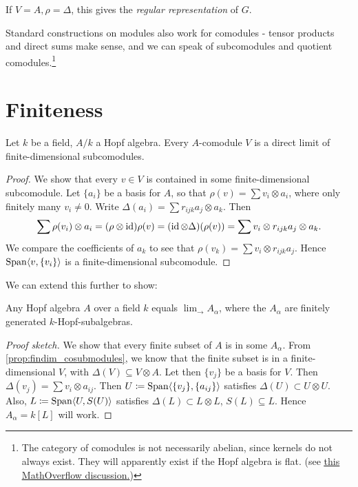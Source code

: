 \documentclass{memoir}
\begin{document}
\begin{example}
	If $ V=A, \rho=\Delta $, this gives the \emph{regular representation} of $ G $.
\end{example}

Standard constructions on modules also work for comodules - tensor products and direct sums make sense, and we can speak of subcomodules and quotient comodules.\footnote{The category of comodules is not necessarily abelian, since kernels do not always exist. They will apparently exist if the Hopf algebra is flat. (see \href{https://mathoverflow.net/questions/94115/when-a-comodule-category-is-equivalent-to-a-module-category}{\underline{this MathOverflow discussion}.})}

\section{Finiteness}\label{sec:finiteness}
\begin{proposition}\label{prop:findim_cosubmodules}
	Let $ k $ be a field, $ A/k $ a Hopf algebra. Every $ A $-comodule $ V $ is a direct limit of finite-dimensional subcomodules.
\end{proposition}
\begin{proof}
	We show that every $ v\in V $ is contained in some finite-dimensional subcomodule. Let $ \{a_i\} $ be a basis for $ A $, so that $ \rho(v)=\sum v_i\otimes a_i $, where only finitely many $ v_i\ne0 $.
	Write $ \Delta(a_i)=\sum r_{ijk}a_j\otimes a_k $.
	Then
	\[ \sum \rho(v_i)\otimes a_i=(\rho\otimes\operatorname{id})\rho(v)=(\operatorname{id}\otimes\Delta)(\rho(v))=\sum v_i\otimes r_{ijk}a_j\otimes a_k .\]
	We compare the coefficients of $ a_k $ to see that $ \rho(v_k)=\sum v_i\otimes r_{ijk}a_j $. Hence $ \operatorname{Span}\langle v, \{v_i\}\rangle $ is a finite-dimensional subcomodule.
\end{proof}
We can extend this further to show:
\begin{theorem}\label{thm:hopfalgs_are_direct_limits}
	Any Hopf algebra $ A $ over a field $ k $ equals $ \lim_{\to}A_\alpha $, where the $ A_\alpha $ are finitely generated $ k $-Hopf-subalgebras.
\end{theorem}
\begin{proof}[Proof sketch]
	We show that every finite subset of $ A $ is in some $ A_\alpha $. From \cref{prop:findim_cosubmodules}, we know that the finite subset is in a finite-dimensional $ V $, with $ \Delta(V)\subseteq V\otimes A $. Let then $ \{v_j\} $ be a basis for $ V $. Then $ \Delta(v_j)=\sum v_i\otimes a_{ij} $.
	Then $ U\coloneqq \operatorname{Span}\langle\{v_j\},\{a_{ij}\}\rangle $ satisfies $ \Delta(U)\subset U\otimes U $. Also, $ L\coloneqq \operatorname{Span}\langle U, S(U)\rangle $ satisfies $ \Delta(L)\subset L\otimes L $, $ S(L)\subseteq L $. Hence $ A_\alpha = k[L] $ will work.
\end{proof}
\end{document}
